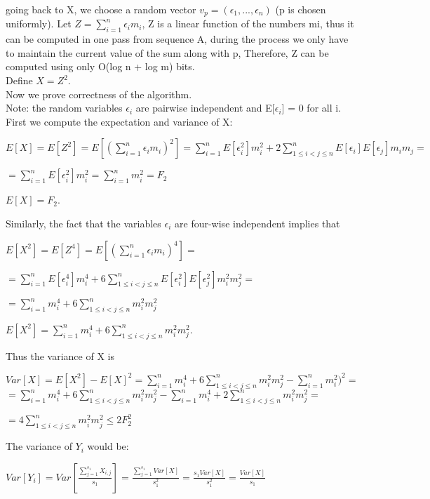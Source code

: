 \documentclass{article}
\begin{document}
going back to X, we choose a random vector \(v_p = (\epsilon_1, ..., \epsilon_n)\) (p is chosen uniformly).
Let \(Z = \sum_{i=1}^{n}\epsilon_i m_i\), Z is a linear function of the numbers mi, thus it can be computed in one pass from sequence A, during the process we only have to
maintain the current value of the sum along with p, Therefore, Z can be computed using only O(log n + log m) bits.\\
Define \(X = Z^2\).\\
Now we prove correctness of the algorithm.\\
Note: the random variables \(\epsilon_i\) are pairwise independent and E[\(\epsilon_i\)] = 0 for all i.\\
First we compute the expectation and variance of X:
\begin{center}
    \(E[X] = E[Z^2] = E[(\sum_{i=1}^{n}\epsilon_i m_i)^2] = \sum_{i=1}^{n}E[\epsilon_i^2] m_i^2 + 2\sum_{1\leq i<j\leq n}^{n}E[\epsilon_i]E[\epsilon_j] m_i m_j = \)
    
    \(= \sum_{i=1}^{n}E[\epsilon_i^2] m_i^2 = \sum_{i=1}^{n}m_i^2 = F_2\)
    
     \(E[X] = F_2\).
\end{center}
Similarly, the fact that the variables \(\epsilon_i\) are four-wise independent implies that
\begin{center}
    \(E[X^2] = E[Z^4] = E[(\sum_{i=1}^{n}\epsilon_i m_i)^4] =\)
    
    \( = \sum_{i=1}^{n}E[\epsilon_i^4] m_i^4 + 6\sum_{1\leq i<j\leq n}^{n}E[\epsilon_i^2]E[\epsilon_j^2] m_i^2 m_j^2 = \)
    
    \(= \sum_{i=1}^{n}m_i^4 + 6\sum_{1\leq i<j\leq n}^{n}m_i^2 m_j^2\)
    
    
     \(E[X^2] = \sum_{i=1}^{n}m_i^4 + 6\sum_{1\leq i<j\leq n}^{n}m_i^2 m_j^2\).
\end{center}
Thus the variance of X is
\begin{center}
    \(Var[X] = E[X^2] - E[X]^2 = 
    \sum_{i=1}^{n}m_i^4 + 6\sum_{1\leq i<j\leq n}^{n}m_i^2 m_j^2 - 
    \sum_{i=1}^{n}m_i^2)^2 =\)
    \( = \sum_{i=1}^{n}m_i^4 + 6\sum_{1\leq i<j\leq n}^{n}m_i^2 m_j^2 -
    \sum_{i=1}^{n}m_i^4 + 2\sum_{1\leq i<j\leq n}^{n}m_i^2 m_j^2 = \)
    
    \(= 4\sum_{1\leq i<j\leq n}^{n}m_i^2 m_j^2 \leq 2F_2^2\)
\end{center}
The variance of \(Y_i\) would be:
\begin{center}
    \(Var[Y_i] = Var[\frac{\sum_{j=1}^{s_1}X_{i,j}}{s_1}] =
    \frac{\sum_{j=1}^{s_1}Var[X]}{s_1^2} = 
    \frac{s_1 Var[X]}{s_1^2} = \frac{Var[X]}{s_1}\)
\end{center}
\end{document}
